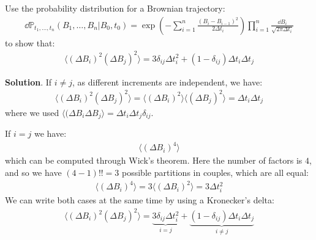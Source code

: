 \documentclass[../template.tex]{subfiles}
\begin{document}
\begin{exo}
    Use the probability distribution for a Brownian trajectory:
    \begin{align*}
        \dd{\mathbb{P}}_{t_1,\dots,t_n}(B_1, \dots, B_n|B_0,t_0) = \exp\left(-\sum_{i=1}^n \frac{(B_i - B_{i-1})^2}{2 \Delta t_i} \right) \prod_{i=1}^n \frac{\dd{B_i}}{\sqrt{2 \pi \Delta t_i}} 
    \end{align*}
    to show that:
    \begin{align*}
        \langle (\Delta B_i)^2 (\Delta B_j)^2 \rangle = 3 \delta_{ij} \Delta t_i^2 + (1-\delta_{ij}) \Delta t_i \Delta t_j
    \end{align*}
    
    \medskip

    \textbf{Solution}. If $i \neq j$, as different increments are independent, we have:
    \begin{align*}
        \langle (\Delta B_i)^2 (\Delta B_j)^2 \rangle = \langle (\Delta B_i)^2 \rangle \langle (\Delta B_j)^2 \rangle = \Delta t_i \Delta t_j
    \end{align*}
    where we used $\langle ( \Delta B_i \Delta B_j  \rangle = \Delta t_i \Delta t_j \delta_{ij}$.

    If $i = j$ we have:
    \begin{align*}
        \langle (\Delta B_i)^4 \rangle
    \end{align*}
    which can be computed through Wick's theorem. Here the number of factors is $4$, and so we have $(4-1)!! = 3$ possible partitions in couples, which are all equal:
    \begin{align*}
        \langle (\Delta B_i)^4 \rangle = 3 \langle (\Delta B_i)^2 \rangle = 3 \Delta t_i^2
    \end{align*}
    We can write both cases at the same time by using a Kronecker's delta:
    \begin{align*}
        \langle (\Delta B_i)^2 (\Delta B_j)^2 \rangle =\underbrace{ 3 \delta_{ij} \Delta t_i^2 }_{i=j}+ \underbrace{(1-\delta_{ij}) \Delta t_i \Delta t_j}_{i \neq j} 
    \end{align*}
\end{exo}
\end{document}
